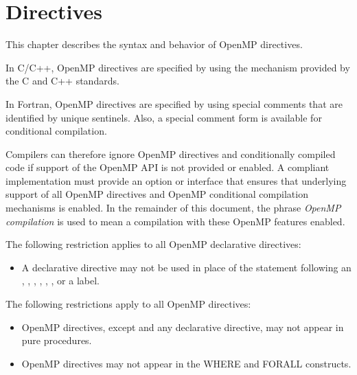 \chapter{Directives}
\label{chap:Directives}
This chapter describes the syntax and behavior of OpenMP directives.

\begin{ccppspecific}
In C/C++, OpenMP directives are specified by using the  mechanism 
provided by the C and C++ standards.
\end{ccppspecific}

\begin{fortranspecific}
In Fortran, OpenMP directives are specified by using special comments that are
identified by unique sentinels. Also, a special comment form is available for 
conditional compilation.
\end{fortranspecific}

Compilers can therefore ignore OpenMP directives and conditionally compiled code if
support of the OpenMP API is not provided or enabled. A compliant implementation
must provide an option or interface that ensures that underlying support of all OpenMP
directives and OpenMP conditional compilation mechanisms is enabled. In the
remainder of this document, the phrase \emph{OpenMP compilation} is used to mean a
compilation with these OpenMP features enabled.

\restrictions

\begin{ccppspecific}
The following restriction applies to all OpenMP declarative directives:
\begin{itemize}
\item A declarative directive may not be used in place of the statement following
      an , , , , , ,
      or a label.
\end{itemize}
\end{ccppspecific}

\begin{fortranspecific}
The following restrictions apply to all OpenMP directives:
\begin{itemize}
  \item OpenMP directives, except  and any declarative directive,
 may not appear in pure procedures.
\item OpenMP directives may not appear in the WHERE and FORALL constructs.
\end{itemize}
\end{fortranspecific}


















